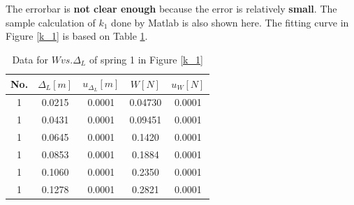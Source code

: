     The errorbar is \textbf{not clear enough} because the error is relatively \textbf{small}. The sample calculation of $k_1$ done by Matlab is also shown here. The fitting curve in Figure \ref{k_1} is based on Table \ref{k1data}.
    \begin{table}
        \centering
        \begin{tabular}{|c|c|c|c|c|}
            \hline
            No. & $\Delta_L[m]$ & $u_{\Delta_L}[m]$ & $W[N]$ & $u_{W}[N]$\\ \hline
            1 & 0.0215 & 0.0001 & 0.04730 & 0.0001\\ \hline
            1 & 0.0431 & 0.0001 & 0.09451 & 0.0001\\ \hline
            1 & 0.0645 & 0.0001 & 0.1420 & 0.0001\\ \hline
            1 & 0.0853 & 0.0001 & 0.1884 & 0.0001\\ \hline
            1 & 0.1060 & 0.0001 & 0.2350 & 0.0001\\ \hline
            1 & 0.1278 & 0.0001 & 0.2821 & 0.0001\\ \hline
        \end{tabular}
        \caption{Data for $W vs. \Delta_L$ of spring 1 in Figure \ref{k_1}}\label{k1data}
    \end{table}
